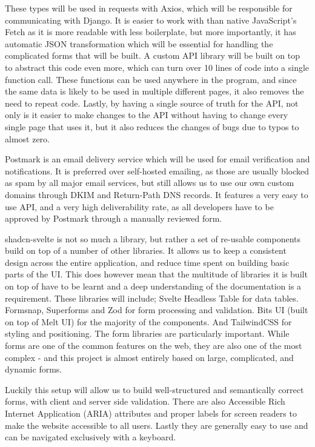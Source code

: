 These types will be used in requests with Axios, which will be responsible for communicating with Django. It is easier to work with than native JavaScript's Fetch as it is more readable with less boilerplate, but more importantly, it has automatic JSON transformation which will be essential for handling the complicated forms that will be built. A custom API library will be built on top to abstract this code even more, which can turn over 10 lines of code into a single function call. These functions can be used anywhere in the program, and since the same data is likely to be used in multiple different pages, it also removes the need to repeat code. Lastly, by having a single source of truth for the API, not only is it easier to make changes to the API without having to change every single page that uses it, but it also reduces the changes of bugs due to typos to almost zero.

Postmark is an email delivery service which will be used for email verification and notifications. It is preferred over self-hosted emailing, as those are usually blocked as spam by all major email services, but still allows us to use our own custom domains through DKIM and Return-Path DNS records. It features a very easy to use API, and a very high deliverability rate, as all developers have to be approved by Postmark through a manually reviewed form.

shadcn-svelte is not so much a library, but rather a set of re-usable components build on top of a number of other libraries. It allows us to keep a consistent design across the entire application, and reduce time spent on building basic parts of the UI. This does however mean that the multitude of libraries it is built on top of have to be learnt and a deep understanding of the documentation is a requirement. These libraries will include; Svelte Headless Table for data tables. Formsnap, Superforms and Zod for form processing and validation. Bits UI (built on top of Melt UI) for the majority of the components. And TailwindCSS for styling and positioning. The form libraries are particularly important. While forms are one of the common features on the web, they are also one of the most complex - and this project is almost entirely based on large, complicated, and dynamic forms.

Luckily this setup will allow us to build well-structured and semantically correct forms, with client and server side validation. There are also Accessible Rich Internet Application (ARIA) attributes and proper labels for screen readers to make the website accessible to all users. Lastly they are generally easy to use and can be navigated exclusively with a keyboard. 

